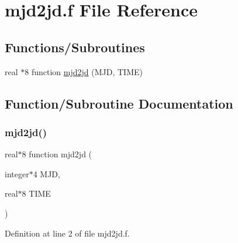\hypertarget{mjd2jd_8f}{}\section{mjd2jd.\+f File Reference}
\label{mjd2jd_8f}
\subsection*{Functions/\+Subroutines}
\begin{DoxyCompactItemize}
\item 
real $\ast$8 function \hyperlink{mjd2jd_8f_a4aa830fa6ed81f7b6bd17de4836cdebf}{mjd2jd} (M\+JD, T\+I\+ME)
\end{DoxyCompactItemize}


\subsection{Function/\+Subroutine Documentation}
\mbox{\label{mjd2jd_8f_a4aa830fa6ed81f7b6bd17de4836cdebf}} 
\subsubsection{\texorpdfstring{mjd2jd()}{mjd2jd()}}
{\footnotesize\ttfamily real$\ast$8 function mjd2jd (\begin{DoxyParamCaption}\item[{integer$\ast$4}]{M\+JD,  }\item[{real$\ast$8}]{T\+I\+ME }\end{DoxyParamCaption})}



Definition at line 2 of file mjd2jd.\+f.

